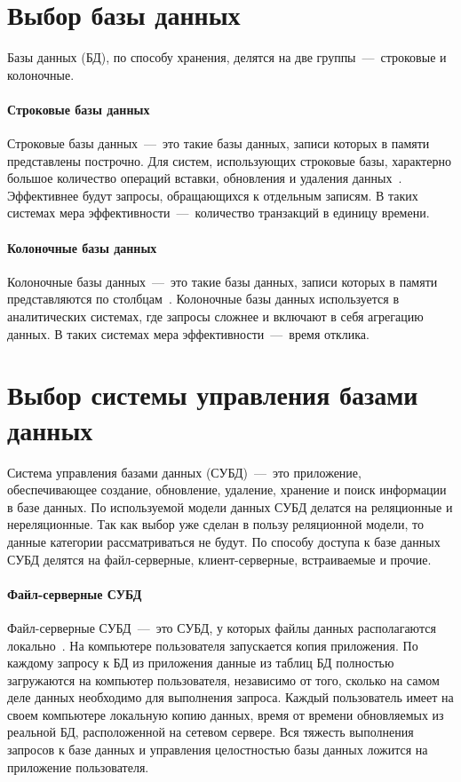 \section{Выбор базы данных}
Базы данных (БД), по способу хранения, делятся на две группы~---~строковые и колоночные.

\paragraph{Строковые базы данных}\mbox{}

Строковые базы данных~---~это такие базы данных, записи которых в памяти представлены построчно. Для систем, использующих строковые базы, характерно большое количество операций вставки, обновления и удаления данных~\cite{bib18}. Эффективнее будут запросы, обращающихся к отдельным записям. В таких системах мера эффективности~---~количество транзакций в единицу времени.

\paragraph{Колоночные базы данных}\mbox{}

Колоночные базы данных~---~это такие базы данных, записи которых в памяти представляются по столбцам~\cite{bib18}. Колоночные базы данных используется в аналитических системах, где запросы сложнее и включают в себя агрегацию данных. В таких системах мера эффективности~---~время отклика.

\section{Выбор системы управления базами данных}
Система управления базами данных (СУБД)~---~это приложение, обеспечивающее создание, обновление, удаление, хранение и поиск информации в базе данных. По используемой модели данных СУБД делатся на реляционные и нереляционные. Так как выбор уже сделан в пользу реляционной модели, то данные категории рассматриваться не будут. По способу доступа к базе данных СУБД делятся на файл-серверные, клиент-серверные, встраиваемые и прочие. 

\paragraph{Файл-серверные СУБД}\mbox{}

Файл-серверные СУБД~---~это СУБД, у которых файлы данных располагаются локально~\cite{bib14}. На компьютере пользователя запускается копия приложения. По каждому запросу к БД из приложения данные из таблиц БД полностью загружаются на компьютер пользователя, независимо от того, сколько на самом деле данных необходимо для выполнения запроса. Каждый пользователь имеет на своем компьютере локальную копию данных, время от времени обновляемых из реальной БД, расположенной на сетевом сервере. Вся тяжесть выполнения запросов к базе данных и управления целостностью базы данных ложится на приложение пользователя.

